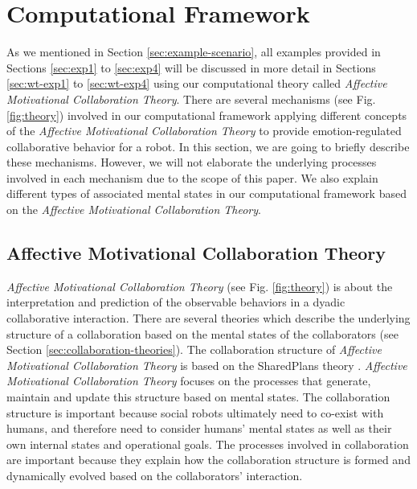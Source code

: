 \section{Computational Framework}
\label{sec:computational-framework}

As we mentioned in Section \ref{sec:example-scenario}, all examples provided in
Sections \ref{sec:exp1} to \ref{sec:exp4} will be discussed in more detail in
Sections \ref{sec:wt-exp1} to \ref{sec:wt-exp4} using our computational theory
called \textit{Affective Motivational Collaboration Theory}. There are several
mechanisms (see Fig. \ref{fig:theory}) involved in our computational framework
applying different concepts of the \textit{Affective Motivational Collaboration
Theory} to provide emotion-regulated collaborative behavior for a robot. In this
section, we are going to briefly describe these mechanisms. However, we will not
elaborate the underlying processes involved in each mechanism due to the scope
of this paper. We also explain different types of associated mental states in
our computational framework based on the \textit{Affective Motivational
Collaboration Theory}.

\subsection{Affective Motivational Collaboration Theory}
\label{sec:AMCT}

\textit{Affective Motivational Collaboration Theory} (see Fig. \ref{fig:theory})
is about the interpretation and prediction of the observable behaviors in a
dyadic collaborative interaction. There are several theories which describe the
underlying structure of a collaboration based on the mental states of the
collaborators (see Section \ref{sec:collaboration-theories}). The collaboration
structure of \textit{Affective Motivational Collaboration Theory} is based on
the SharedPlans theory
\cite{grosz:planning-acting,grosz:collaboration,grosz:plans-discourse}.
\textit{Affective Motivational Collaboration Theory} focuses on the processes
that generate, maintain and update this structure based on mental states. The
collaboration structure is important because social robots ultimately need to
co-exist with humans, and therefore need to consider humans' mental states as
well as their own internal states and operational goals. The processes involved
in collaboration are important because they explain how the collaboration
structure is formed and dynamically evolved based on the collaborators'
interaction.

